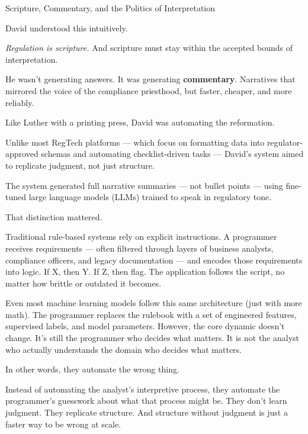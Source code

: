 \begin{HistoricalSidebar}{Scripture, Commentary, and the Politics of Interpretation}
    \medskip
    
    David understood this intuitively.

    \medskip
    
    \textit{Regulation is scripture.} And scripture must stay within the accepted bounds of interpretation.
    
    \medskip
    
    He wasn’t generating answers. It was generating \textbf{commentary}.
    Narratives that mirrored the voice of the compliance priesthood, but faster, cheaper, and more reliably.

    \medskip
    
    Like Luther with a printing press, David was automating the reformation.
    
\end{HistoricalSidebar}

\medskip

Unlike most RegTech platforms --- which focus on formatting data into regulator-approved schemas and automating 
checklist-driven tasks --- David’s system aimed to replicate judgment, not just structure. 

The system generated full narrative summaries --- not bullet points --- using fine-tuned large language models 
(LLMs) trained to speak in regulatory tone.

That distinction mattered.

Traditional rule-based systems rely on explicit instructions. A programmer receives requirements --- often filtered 
through layers of business analysts, compliance officers, and legacy documentation --- and encodes those 
requirements into logic.
If X, then Y. If Z, then flag.
The application follows the script, no matter how brittle or outdated it becomes.

Even most machine learning models follow this same architecture (just with more math). 
The programmer replaces the rulebook with a set of engineered features, supervised labels, and model parameters. 
However, the core dynamic doesn’t change. 
It’s still the programmer who decides what matters. 
It is not the analyst who actually understands the domain who decides what matters.

In other words, they automate the wrong thing.

Instead of automating the analyst’s interpretive process, they automate the programmer’s guesswork about what that 
process might be.
They don’t learn judgment. They replicate structure.
And structure without judgment is just a faster way to be wrong at scale.

